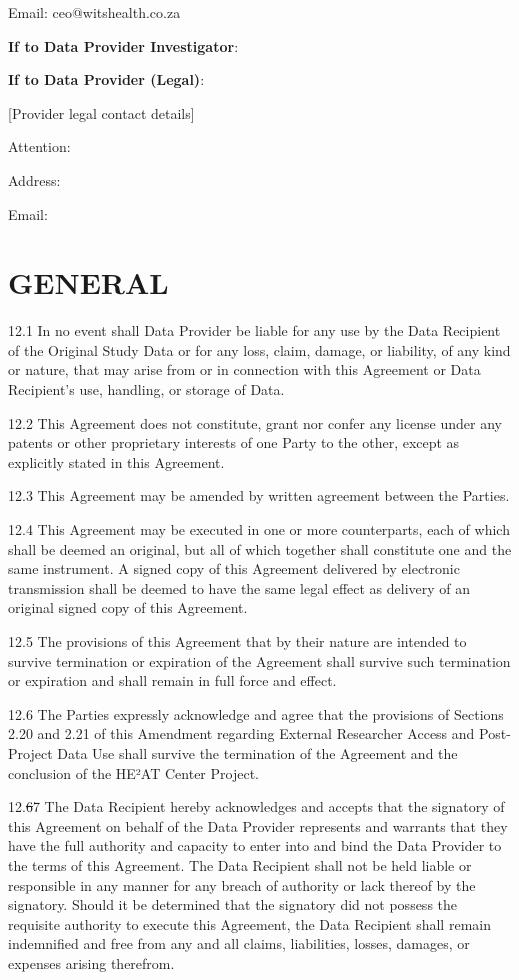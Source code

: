 \documentclass[12pt,letterpaper]{article}
\newcommand{\deleted}[1]{\textcolor{deletecolor}{\sout{#1}}}
\newcommand{\added}[1]{\textcolor{addcolor}{#1}}
\begin{document}
Email: ceo@witshealth.co.za

\textbf{If to Data Provider Investigator}:

\textbf{If to Data Provider (Legal)}:

[Provider legal contact details]

Attention:

Address:

Email:

\section{GENERAL}

12.1 In no event shall Data Provider be liable for any use by the Data Recipient of the Original Study Data or for any loss, claim, damage, or liability, of any kind or nature, that may arise from or in connection with this Agreement or Data Recipient's use, handling, or storage of Data.

12.2 This Agreement does not constitute, grant nor confer any license under any patents or other proprietary interests of one Party to the other, except as explicitly stated in this Agreement.

12.3 This Agreement may be amended by written agreement between the Parties.

12.4 This Agreement may be executed in one or more counterparts, each of which shall be deemed an original, but all of which together shall constitute one and the same instrument. A signed copy of this Agreement delivered by electronic transmission shall be deemed to have the same legal effect as delivery of an original signed copy of this Agreement.

12.5 The provisions of this Agreement that by their nature are intended to survive termination or expiration of the Agreement shall survive such termination or expiration and shall remain in full force and effect.

\added{12.6 The Parties expressly acknowledge and agree that the provisions of Sections 2.20 and 2.21 of this Amendment regarding External Researcher Access and Post-Project Data Use shall survive the termination of the Agreement and the conclusion of the HE²AT Center Project.}

12.\deleted{6}\added{7} The Data Recipient hereby acknowledges and accepts that the signatory of this Agreement on behalf of the Data Provider represents and warrants that they have the full authority and capacity to enter into and bind the Data Provider to the terms of this Agreement. The Data Recipient shall not be held liable or responsible in any manner for any breach of authority or lack thereof by the signatory. Should it be determined that the signatory did not possess the requisite authority to execute this Agreement, the Data Recipient shall remain indemnified and free from any and all claims, liabilities, losses, damages, or expenses arising therefrom.
\end{document}

